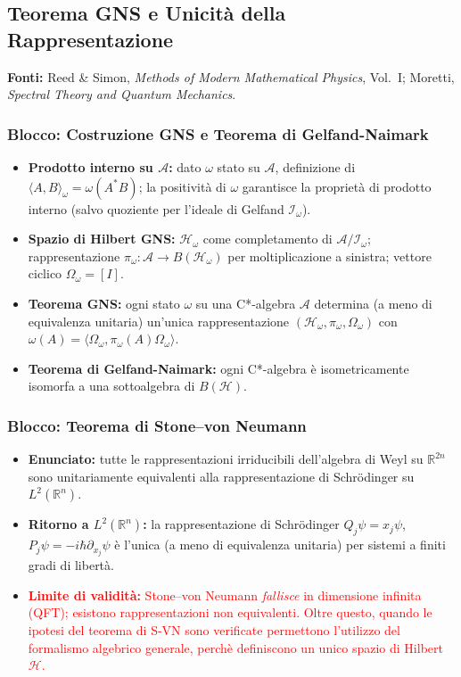 \documentclass[12pt, a4paper]{article}
\newcommand{\fonti}[1]{%
	\begin{fontebox}
		\textcolor{fontecolor}{\footnotesize\textbf{Fonti:} #1}
	\end{fontebox}%
}
\begin{document}
	\subsection{Teorema GNS e Unicità della Rappresentazione}
	
	\fonti{Reed \& Simon, \textit{Methods of Modern Mathematical Physics}, Vol.~I; Moretti, \textit{Spectral Theory and Quantum Mechanics}.}
	
	\subsubsection{Blocco: Costruzione GNS e Teorema di Gelfand-Naimark}
	\begin{itemize}
		\item \textbf{Prodotto interno su $\mathcal{A}$:} dato $\omega$ stato su $\mathcal{A}$, definizione di $\langle A, B\rangle_\omega = \omega(A^*B)$; la positività di $\omega$ garantisce la proprietà di prodotto interno (salvo quoziente per l'ideale di Gelfand $\mathcal{I}_\omega$).
		\item \textbf{Spazio di Hilbert GNS:} $\mathcal{H}_\omega$ come completamento di $\mathcal{A}/\mathcal{I}_\omega$; rappresentazione $\pi_\omega: \mathcal{A} \to B(\mathcal{H}_\omega)$ per moltiplicazione a sinistra; vettore ciclico $\Omega_\omega = [I]$.
		\item \textbf{Teorema GNS:} ogni stato $\omega$ su una C*-algebra $\mathcal{A}$ determina (a meno di equivalenza unitaria) un'unica rappresentazione $(\mathcal{H}_\omega, \pi_\omega, \Omega_\omega)$ con $\omega(A) = \langle\Omega_\omega, \pi_\omega(A)\Omega_\omega\rangle$.
		\item \textbf{Teorema di Gelfand-Naimark:} ogni C*-algebra è isometricamente isomorfa a una sottoalgebra di $B(\mathcal{H})$.
	\end{itemize}
	
	\subsubsection{Blocco: Teorema di Stone--von Neumann}
	\begin{itemize}
		\item \textbf{Enunciato:} tutte le rappresentazioni irriducibili dell'algebra di Weyl su $\mathbb{R}^{2n}$ sono unitariamente equivalenti alla rappresentazione di Schrödinger su $L^2(\mathbb{R}^n)$. 
		\item \textbf{Ritorno a $L^2(\mathbb{R}^n)$:} la rappresentazione di Schrödinger $Q_j \psi = x_j\psi$, $P_j\psi = -i\hbar\partial_{x_j}\psi$ è l'unica (a meno di equivalenza unitaria) per sistemi a finiti gradi di libertà.
		\item \textcolor{red}{\textbf{Limite di validità:} Stone--von Neumann \emph{fallisce} in dimensione infinita (QFT); esistono rappresentazioni non equivalenti. Oltre questo, quando le ipotesi del teorema di S-VN sono verificate permettono l'utilizzo del formalismo algebrico generale, perchè definiscono un unico spazio di Hilbert $\mathcal{H}$.}
	\end{itemize}
	
\end{document}

